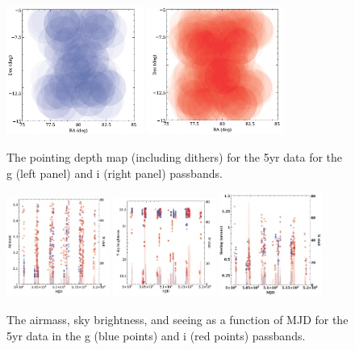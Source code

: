 \documentclass[12pt]{article}
\begin{document}
\begin{figure}
\centerline{
\includegraphics[width=0.4\textwidth]{Figures/depth_g.png}\hfil
\includegraphics[width=0.4\textwidth]{Figures/depth_i.png}
}
\caption{The pointing depth map (including dithers) for the 5yr data for the g (left panel)
 and i (right panel)  passbands.}
\label{depth}
\end{figure}


\begin{figure}
\centerline{
\includegraphics[width=0.3\textwidth]{Figures/airmass_mjd.png}\hfil
\includegraphics[width=0.3\textwidth]{Figures/sky_mjd.png}\hfil
\includegraphics[width=0.3\textwidth]{Figures/seeing.png}
}
\caption{The airmass, sky brightness, and seeing as a function of MJD for the
  5yr data in the g (blue points) and i (red points) passbands.}
\label{airmass}
\end{figure}
\end{document}
